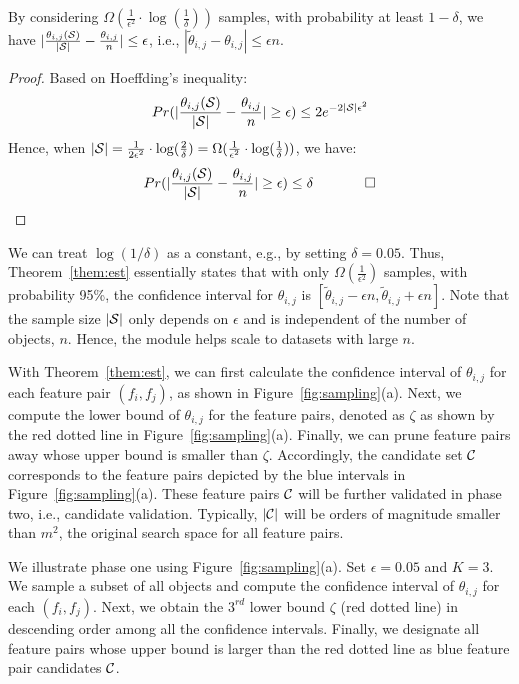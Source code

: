 \begin{theorem}\label{them:est}
By considering $\Omega(\frac{1}{\epsilon^2}\cdot \log(\frac{1}{\delta}))$ samples, with probability at least $1-\delta$, we have $|\frac{\theta_{i,j}(\sss)}{|\sss|}-\frac{\theta_{i,j}}{n}| \leq \epsilon$, i.e., $|\tilde{\theta}_{i,j}-\theta_{i,j}|\leq \epsilon n$.
\end{theorem}

\begin{proof}
   Based on Hoeffding's inequality:
   $$Pr(|\frac{\theta_{i,j}(\sss)}{|\sss|}-\frac{\theta_{i,j}}{n}| \geq \epsilon) \leq 2e^{-2|\sss|\epsilon^2}$$
   Hence, when $|\sss| = \frac{1}{2\epsilon^2}\cdot \log(\frac{2}{\delta}) = \Omega(\frac{1}{\epsilon^2}\cdot \log(\frac{1}{\delta}))$, we have:
$$
   Pr(|\frac{\theta_{i,j}(\sss)}{|\sss|}-\frac{\theta_{i,j}}{n}| \geq \epsilon) \leq \delta \ \ \ \ \ \ \ \ \ \ \ \square
$$ 
\end{proof}
\noindent We can treat $\log(1/\delta)$ as a constant, e.g., by setting $\delta = 0.05$. Thus, Theorem~\ref{them:est} essentially states that with only $\Omega(\frac{1}{\epsilon^2})$ samples, with probability 95\%, the confidence interval for $\theta_{i,j}$ is $[\tilde{\theta}_{i,j}-\epsilon n, \tilde{\theta}_{i,j}+\epsilon n]$. Note that the sample size $|\sss|$ only depends on $\epsilon$ and is independent of the number of objects, $n$. Hence, the \sampling module helps \genviz scale to datasets with large $n$.

With Theorem~\ref{them:est}, we can first calculate the confidence interval of $\theta_{i,j}$ for each feature pair $(f_i,f_j)$, as shown in Figure~\ref{fig:sampling}(a). Next, we compute the lower bound of $\theta_{i,j}$ for the \topk feature pairs, denoted as $\zeta$ as shown by the red dotted line in Figure~\ref{fig:sampling}(a). Finally, we can prune feature pairs away whose upper bound is smaller than $\zeta$. Accordingly, the candidate set $\cc$ corresponds to the feature pairs depicted by the blue intervals in Figure~\ref{fig:sampling}(a). These feature pairs $\cc$ will be further validated in phase two, i.e., candidate validation. Typically, $|\cc|$ will be orders of magnitude smaller than $m^2$, the original search space for all feature pairs. 

\begin{example}
We illustrate phase one using Figure~\ref{fig:sampling}(a). Set $\epsilon = 0.05$ and $K=3$. We sample a subset of all objects and compute the confidence interval of $\theta_{i,j}$ for each $(f_i,f_j)$. Next, we obtain the $3^{rd}$ lower bound $\zeta$ (red dotted line) in descending order among all the confidence intervals. Finally, we designate all feature pairs whose upper bound is larger than the red dotted line as blue feature pair candidates $\cc$.
\end{example}

